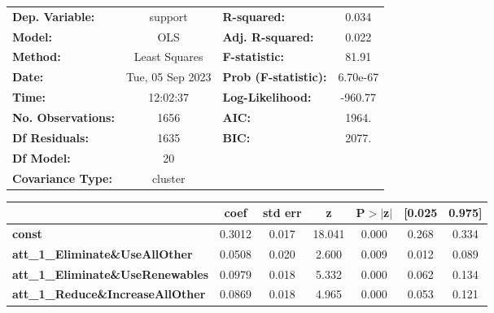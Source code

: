 \begin{center}
\begin{tabular}{lclc}
\toprule
\textbf{Dep. Variable:}                     &     support      & \textbf{  R-squared:         } &     0.034   \\
\textbf{Model:}                             &       OLS        & \textbf{  Adj. R-squared:    } &     0.022   \\
\textbf{Method:}                            &  Least Squares   & \textbf{  F-statistic:       } &     81.91   \\
\textbf{Date:}                              & Tue, 05 Sep 2023 & \textbf{  Prob (F-statistic):} &  6.70e-67   \\
\textbf{Time:}                              &     12:02:37     & \textbf{  Log-Likelihood:    } &   -960.77   \\
\textbf{No. Observations:}                  &        1656      & \textbf{  AIC:               } &     1964.   \\
\textbf{Df Residuals:}                      &        1635      & \textbf{  BIC:               } &     2077.   \\
\textbf{Df Model:}                          &          20      & \textbf{                     } &             \\
\textbf{Covariance Type:}                   &     cluster      & \textbf{                     } &             \\
\bottomrule
\end{tabular}
\begin{tabular}{lcccccc}
                                            & \textbf{coef} & \textbf{std err} & \textbf{z} & \textbf{P$> |$z$|$} & \textbf{[0.025} & \textbf{0.975]}  \\
\midrule
\textbf{const}                              &       0.3012  &        0.017     &    18.041  &         0.000        &        0.268    &        0.334     \\
\textbf{att\_1\_Eliminate\&UseAllOther}     &       0.0508  &        0.020     &     2.600  &         0.009        &        0.012    &        0.089     \\
\textbf{att\_1\_Eliminate\&UseRenewables}   &       0.0979  &        0.018     &     5.332  &         0.000        &        0.062    &        0.134     \\
\textbf{att\_1\_Reduce\&IncreaseAllOther}   &       0.0869  &        0.018     &     4.965  &         0.000        &        0.053    &        0.121     \\

\end{tabular}
\end{center}
